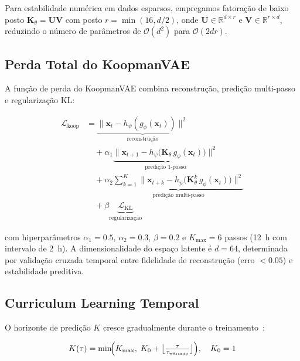 Para estabilidade numérica em dados esparsos, empregamos fatoração de baixo posto $\mathbf{K}_\theta = \mathbf{U}\mathbf{V}$ com posto $r = \min(16, d/2)$, onde $\mathbf{U} \in \mathbb{R}^{d \times r}$ e $\mathbf{V} \in \mathbb{R}^{r \times d}$, reduzindo o número de parâmetros de $\mathcal{O}(d^2)$ para $\mathcal{O}(2dr)$.

\subsection{Perda Total do KoopmanVAE}
\label{sec:koopman-loss}

A função de perda do KoopmanVAE combina reconstrução, predição multi-passo e regularização KL:

\begin{align}
\mathcal{L}_{\text{koop}} &= 
\underbrace{\bigl\| \mathbf{x}_t - h_\psi(g_\phi(\mathbf{x}_t)) \bigr\|^2}_{\text{reconstrução}} \nonumber \\
&\quad + \alpha_1 \underbrace{\bigl\| \mathbf{x}_{t+1} - h_\psi\bigl(\mathbf{K}_\theta\, g_\phi(\mathbf{x}_t)\bigr) \bigr\|^2}_{\text{predição 1-passo}} \nonumber \\
&\quad + \alpha_2 \underbrace{\sum_{k=1}^{K} \bigl\| \mathbf{x}_{t+k} - h_\psi\bigl(\mathbf{K}_\theta^k\, g_\phi(\mathbf{x}_t)\bigr) \bigr\|^2}_{\text{predição multi-passo}} \nonumber \\
&\quad + \beta \underbrace{\mathcal{L}_{\text{KL}}}_{\text{regularização}}
\label{eq:koopman_total_loss}
\end{align}

com hiperparâmetros $\alpha_1 = 0.5$, $\alpha_2 = 0.3$, $\beta = 0.2$ e $K_{\max} = 6$ passos (12~h com intervalo de 2~h). A dimensionalidade do espaço latente é $d = 64$, determinada por validação cruzada temporal entre fidelidade de reconstrução (erro $< 0.05$) e estabilidade preditiva.

\subsection{Curriculum Learning Temporal}
\label{sec:curriculum}

O horizonte de predição $K$ cresce gradualmente durante o treinamento~\cite{article:bengio2009curriculum}:

\begin{equation}
K(\tau) = \min\!\Bigl(K_{\max},\; K_0 + \bigl\lfloor \tfrac{\tau}{\tau_{\text{warmup}}} \bigr\rfloor \Bigr), \quad K_0 = 1
\label{eq:curriculum}
\end{equation}

